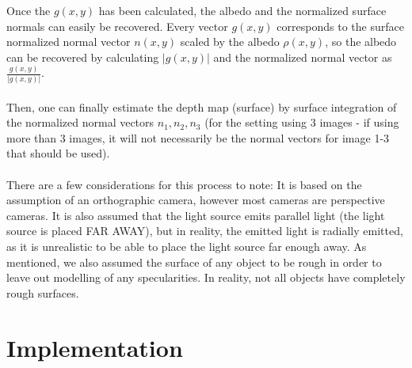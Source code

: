 \documentclass[12pt,a4paper,oneside,final]{article}
\begin{document}
Once the $g(x,y)$ has been calculated, the albedo and the normalized surface normals can easily be recovered. Every vector $g(x,y)$ corresponds to the surface normalized normal vector $n(x,y)$ scaled by the albedo $\rho(x,y)$, so the albedo can be recovered by calculating $|g(x,y)|$ and the normalized normal vector as $\frac{g(x,y)}{|g(x,y)|}$.\\\\
Then, one can finally estimate the depth map (surface) by surface integration of the normalized normal vectors $n_1, n_2, n_3$ (for the setting using 3 images - if using more than 3 images, it will not necessarily be the normal vectors for image 1-3 that should be used).\\\\
There are a few considerations for this process to note: It is based on the assumption of an orthographic camera, however most cameras are perspective cameras. It is also assumed that the light source emits parallel light (the light source is placed FAR AWAY), but in reality, the emitted light is radially emitted, as it is unrealistic to be able to place the light source far enough away. As mentioned, we also assumed the surface of any object to be rough in order to leave out modelling of any specularities. In reality, not all objects have completely rough surfaces.

\section{Implementation}
\end{document}
